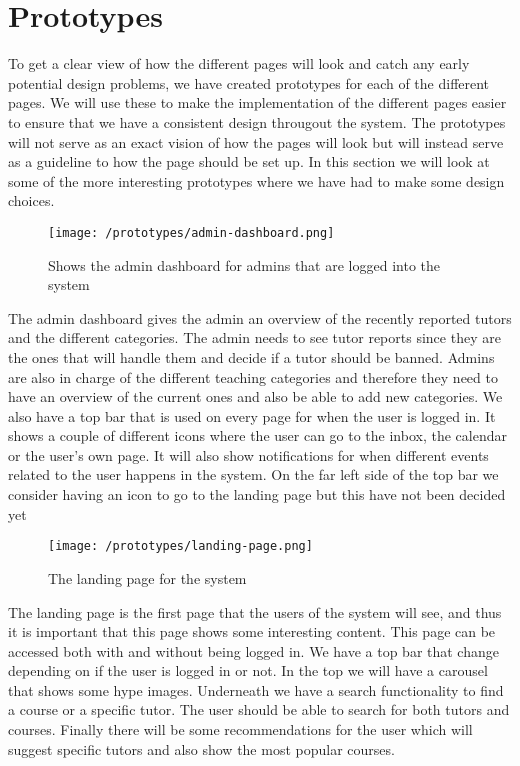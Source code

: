 \section{Prototypes}
To get a clear view of how the different pages will look and catch any early potential design problems, we have created prototypes for each of the different pages. 
We will use these to make the implementation of the different pages easier to ensure that we have a consistent design througout the system. 
The prototypes will not serve as an exact vision of how the pages will look but will instead serve as a guideline to how the page should be set up.
In this section we will look at some of the more interesting prototypes where we have had to make some design choices.
\begin{figure}[H]
    \texttt{[image: /prototypes/admin-dashboard.png]}
     \caption{Shows the admin dashboard for admins that are logged into the system}
     \label{fig:admin-dashboard}
 \end{figure}
The admin dashboard gives the admin an overview of the recently reported tutors and the different categories. 
The admin needs to see tutor reports since they are the ones that will handle them and decide if a tutor should be banned. 
Admins are also in charge of the different teaching categories and therefore they need to have an overview of the current ones and also be able to add new categories.
We also have a top bar that is used on every page for when the user is logged in. It shows a couple of different icons where the user can go to the inbox, the calendar or the user's own page. It will also show notifications for when different events related to the user happens in the system. On the far left side of the top bar we consider having an icon to go to the landing page but this have not been decided yet
\begin{figure}[H]
   \texttt{[image: /prototypes/landing-page.png]}
    \caption{The landing page for the system}
    \label{fig:landing-page}
\end{figure}
The landing page is the first page that the users of the system will see, and thus it is important that this page shows some interesting content. 
This page can be accessed both with and without being logged in. 
We have a top bar that change depending on if the user is logged in or not. 
In the top we will have a carousel that shows some hype images.
Underneath we have a search functionality to find a course or a specific tutor. 
The user should be able to search for both tutors and courses. 
Finally there will be some recommendations for the user which will suggest specific tutors and also show the most popular courses. 

